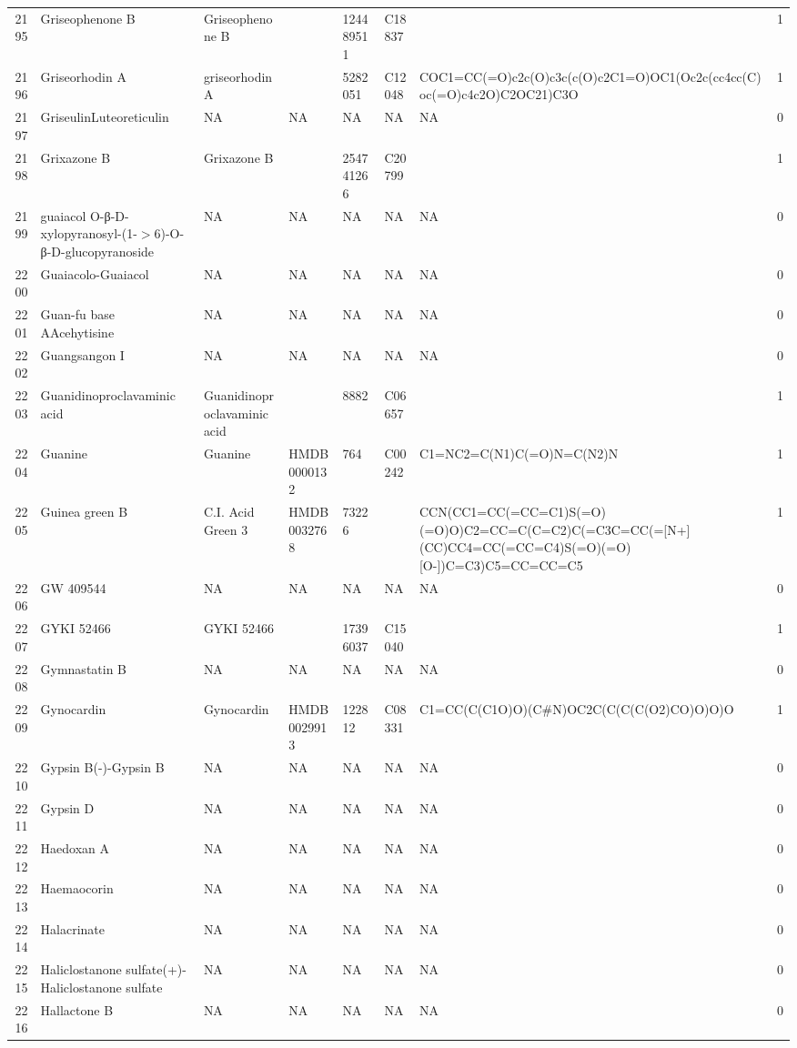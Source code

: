 \documentclass[a4paper]{article}
\begin{document}
\begin{longtable}{rlllllll}
  2195 & Griseophenone B & Griseophenone B &  & 124489511 & C18837 &  & 1 \\ 
  2196 & Griseorhodin A & griseorhodin A &  & 5282051 & C12048 & COC1=CC(=O)c2c(O)c3c(c(O)c2C1=O)OC1(Oc2c(cc4cc(C)oc(=O)c4c2O)C2OC21)C3O & 1 \\ 
  2197 & GriseulinLuteoreticulin & NA & NA & NA & NA & NA & 0 \\ 
  2198 & Grixazone B & Grixazone B &  & 254741266 & C20799 &  & 1 \\ 
  2199 & guaiacol O-β-D-xylopyranosyl-(1-$>$6)-O-β-D-glucopyranoside & NA & NA & NA & NA & NA & 0 \\ 
  2200 & Guaiacolo-Guaiacol & NA & NA & NA & NA & NA & 0 \\ 
  2201 & Guan-fu base AAcehytisine & NA & NA & NA & NA & NA & 0 \\ 
  2202 & Guangsangon I & NA & NA & NA & NA & NA & 0 \\ 
  2203 & Guanidinoproclavaminic acid & Guanidinoproclavaminic acid &  & 8882 & C06657 &  & 1 \\ 
  2204 & Guanine & Guanine & HMDB0000132 & 764 & C00242 & C1=NC2=C(N1)C(=O)N=C(N2)N & 1 \\ 
  2205 & Guinea green B & C.I. Acid Green 3 & HMDB0032768 & 73226 &  & CCN(CC1=CC(=CC=C1)S(=O)(=O)O)C2=CC=C(C=C2)C(=C3C=CC(=[N+](CC)CC4=CC(=CC=C4)S(=O)(=O)[O-])C=C3)C5=CC=CC=C5 & 1 \\ 
  2206 & GW 409544 & NA & NA & NA & NA & NA & 0 \\ 
  2207 & GYKI 52466 & GYKI 52466 &  & 17396037 & C15040 &  & 1 \\ 
  2208 & Gymnastatin B & NA & NA & NA & NA & NA & 0 \\ 
  2209 & Gynocardin & Gynocardin & HMDB0029913 & 122812 & C08331 & C1=CC(C(C1O)O)(C\#N)OC2C(C(C(C(O2)CO)O)O)O & 1 \\ 
  2210 & Gypsin B(-)-Gypsin B & NA & NA & NA & NA & NA & 0 \\ 
  2211 & Gypsin D & NA & NA & NA & NA & NA & 0 \\ 
  2212 & Haedoxan A & NA & NA & NA & NA & NA & 0 \\ 
  2213 & Haemaocorin & NA & NA & NA & NA & NA & 0 \\ 
  2214 & Halacrinate & NA & NA & NA & NA & NA & 0 \\ 
  2215 & Haliclostanone sulfate(+)-Haliclostanone sulfate & NA & NA & NA & NA & NA & 0 \\ 
  2216 & Hallactone B & NA & NA & NA & NA & NA & 0 \\ 

\end{longtable}
\end{document}
